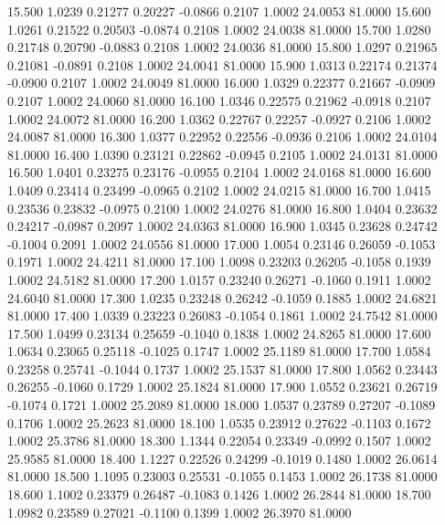   15.500   1.0239   0.21277   0.20227  -0.0866   0.2107   1.0002  24.0053  81.0000
  15.600   1.0261   0.21522   0.20503  -0.0874   0.2108   1.0002  24.0038  81.0000
  15.700   1.0280   0.21748   0.20790  -0.0883   0.2108   1.0002  24.0036  81.0000
  15.800   1.0297   0.21965   0.21081  -0.0891   0.2108   1.0002  24.0041  81.0000
  15.900   1.0313   0.22174   0.21374  -0.0900   0.2107   1.0002  24.0049  81.0000
  16.000   1.0329   0.22377   0.21667  -0.0909   0.2107   1.0002  24.0060  81.0000
  16.100   1.0346   0.22575   0.21962  -0.0918   0.2107   1.0002  24.0072  81.0000
  16.200   1.0362   0.22767   0.22257  -0.0927   0.2106   1.0002  24.0087  81.0000
  16.300   1.0377   0.22952   0.22556  -0.0936   0.2106   1.0002  24.0104  81.0000
  16.400   1.0390   0.23121   0.22862  -0.0945   0.2105   1.0002  24.0131  81.0000
  16.500   1.0401   0.23275   0.23176  -0.0955   0.2104   1.0002  24.0168  81.0000
  16.600   1.0409   0.23414   0.23499  -0.0965   0.2102   1.0002  24.0215  81.0000
  16.700   1.0415   0.23536   0.23832  -0.0975   0.2100   1.0002  24.0276  81.0000
  16.800   1.0404   0.23632   0.24217  -0.0987   0.2097   1.0002  24.0363  81.0000
  16.900   1.0345   0.23628   0.24742  -0.1004   0.2091   1.0002  24.0556  81.0000
  17.000   1.0054   0.23146   0.26059  -0.1053   0.1971   1.0002  24.4211  81.0000
  17.100   1.0098   0.23203   0.26205  -0.1058   0.1939   1.0002  24.5182  81.0000
  17.200   1.0157   0.23240   0.26271  -0.1060   0.1911   1.0002  24.6040  81.0000
  17.300   1.0235   0.23248   0.26242  -0.1059   0.1885   1.0002  24.6821  81.0000
  17.400   1.0339   0.23223   0.26083  -0.1054   0.1861   1.0002  24.7542  81.0000
  17.500   1.0499   0.23134   0.25659  -0.1040   0.1838   1.0002  24.8265  81.0000
  17.600   1.0634   0.23065   0.25118  -0.1025   0.1747   1.0002  25.1189  81.0000
  17.700   1.0584   0.23258   0.25741  -0.1044   0.1737   1.0002  25.1537  81.0000
  17.800   1.0562   0.23443   0.26255  -0.1060   0.1729   1.0002  25.1824  81.0000
  17.900   1.0552   0.23621   0.26719  -0.1074   0.1721   1.0002  25.2089  81.0000
  18.000   1.0537   0.23789   0.27207  -0.1089   0.1706   1.0002  25.2623  81.0000
  18.100   1.0535   0.23912   0.27622  -0.1103   0.1672   1.0002  25.3786  81.0000
  18.300   1.1344   0.22054   0.23349  -0.0992   0.1507   1.0002  25.9585  81.0000
  18.400   1.1227   0.22526   0.24299  -0.1019   0.1480   1.0002  26.0614  81.0000
  18.500   1.1095   0.23003   0.25531  -0.1055   0.1453   1.0002  26.1738  81.0000
  18.600   1.1002   0.23379   0.26487  -0.1083   0.1426   1.0002  26.2844  81.0000
  18.700   1.0982   0.23589   0.27021  -0.1100   0.1399   1.0002  26.3970  81.0000

